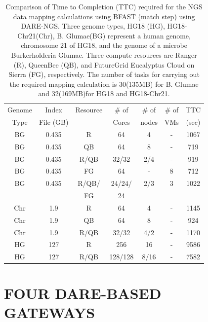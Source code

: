 \documentclass{sig-alternate}
\begin{document}
 \begin{table}
\scriptsize
 \begin{tabular}{|c|c|c|c|c|c|c|} 
 \hline 
Genome & Index         & Resource    & \# of & \# of &   \# of         &	TTC  \\
  Type               & File (GB)        & &Cores &   nodes &  VMs&  (sec)\\  
  \hline
 BG &0.435& R&	64 &4&-	&1067 \\
\hline                  
BG &0.435& QB	&	64& 8&-	&719 \\
\hline
 BG &0.435&R/QB	&	32/32 &2/4& -&919 \\
\hline
 BG &0.435& FG &	64 &-&8	&712 \\
\hline
 BG &0.435 &  R/QB/ &	24/24/& 2/3 & 3 &1022\\
 & & FG& 24 &&&\\
\hline
\hline
Chr &1.9& R	&	64& 4 &-&1145 \\
\hline
Chr &1.9& QB	&	64&8&-	&924 \\
\hline
Chr &1.9& R/QB	&	32/32& 4/2&	-&1170 \\
\hline
\hline
HG &127& R	&	256 & 16 &-	&9586\\
\hline
HG &127& R/QB	&	128/128&8/16 & -&7582 \\
\hline
\end{tabular}
\caption{
  Comparison of Time to Completion (TTC) required for the NGS data
  mapping calculations using BFAST (match step) using DARE-NGS.  
  Three genome types,
  HG18 (HG), HG18-Chr21(Chr), B. Glumae(BG) represent a human genome,
  chromosome 21 of HG18, and the genome of a microbe Burkerholderia
  Glumae.  Three compute resources are Ranger (R), QueenBee (QB), and
  FutureGrid  Eucalyptus Cloud on Sierra (FG), respectively.  The
  number of tasks for carrying out the required mapping calculation is
  30(135MB) for B. Glumae and 32(169MB)for HG18 and HG18-Chr21.
}

  \label{table:NGS-Distributed} 
\end{table}


\section{FOUR DARE-BASED GATEWAYS}
\end{document}
